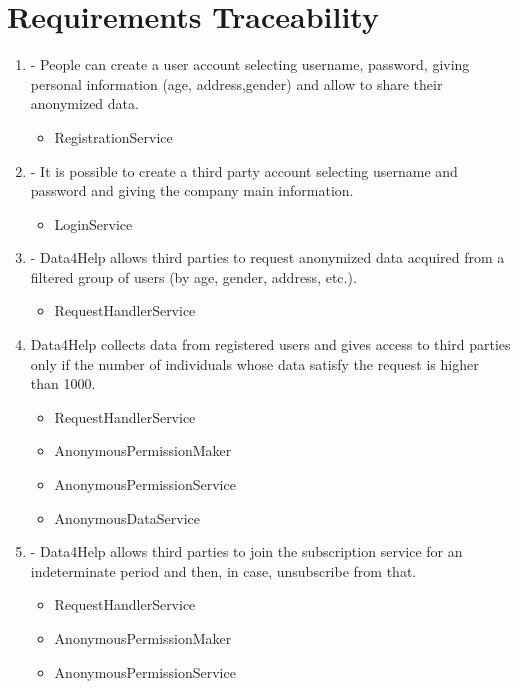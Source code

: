 \documentclass[a4paper]{article}
\begin{document}
\section{Requirements Traceability}

\begin{enumerate}[label*=\bf{R.\arabic*}]

\item - People can create a user account selecting username, password,
giving personal information (age, address,gender) and allow to
share their anonymized data.

\begin{itemize}
\item RegistrationService
\end{itemize}

\item - It is possible to create a third party account selecting username
and password and giving the company main information.

\begin{itemize}
\item LoginService
\end{itemize}

\item - Data4Help allows third parties to request anonymized data acquired
from a filtered group of users (by age, gender, address, etc.).

\begin{itemize}
\item RequestHandlerService
\end{itemize}

\item Data4Help collects data from registered users and gives access to
third parties only if the number of individuals whose data satisfy the
request is higher than 1000.

\begin{itemize}
\item RequestHandlerService
\item AnonymousPermissionMaker
\item AnonymousPermissionService
\item AnonymousDataService
\end{itemize}

\item - Data4Help allows third parties to join the subscription service for an
indeterminate period and then, in case, unsubscribe from that.

\begin{itemize}
\item RequestHandlerService
\item AnonymousPermissionMaker
\item AnonymousPermissionService
\end{itemize}


\end{enumerate}
\end{document}
